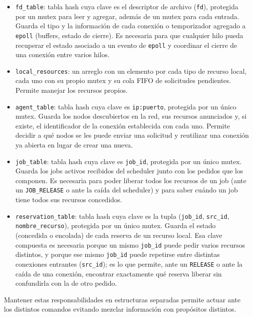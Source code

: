 \documentclass[a4paper,10pt]{article}
\begin{document}
\begin{itemize}
    \item \texttt{fd\_table}: tabla hash cuya clave es el descriptor de archivo (\texttt{fd}),
    protegida por un mutex para leer y agregar, además de un mutex para cada entrada. Guarda el tipo y la información de cada conexión o temporizador
    agregado a \texttt{epoll} (buffers, estado de cierre). Es necesaria para que cualquier hilo
    pueda recuperar el estado asociado a un evento de \texttt{epoll} y coordinar el cierre de una
    conexión entre varios hilos.
    \item \texttt{local\_resources}: un arreglo con un elemento por cada
    tipo de recurso local, cada uno con su propio mutex y su cola FIFO de solicitudes pendientes.
    Permite manejar los recursos propios.
    \item \texttt{agent\_table}: tabla hash cuya clave es \texttt{ip:puerto}, protegida por un único
    mutex. Guarda los nodos descubiertos en la red, sus recursos anunciados y, si existe, el
    identificador de la conexión establecida con cada uno. Permite decidir a qué nodos se les puede
    enviar una solicitud y reutilizar una conexión ya abierta en lugar de crear una nueva.
    \item \texttt{job\_table}: tabla hash cuya clave es \texttt{job\_id}, protegida por un único
    mutex. Guarda los jobs activos recibidos del scheduler junto con los pedidos que los componen.
    Es necesaria para poder liberar todos los recursos de un job (ante un \texttt{JOB\_RELEASE} o
    ante la caída del scheduler) y para saber cuándo un job tiene todos sus recursos concedidos.
    \item \texttt{reservation\_table}: tabla hash cuya clave es la tupla
    (\texttt{job\_id}, \texttt{src\_id}, \texttt{nombre\_recurso}), protegida por un único mutex.
    Guarda el estado (concedida o encolada) de cada reserva de un recurso local. Esa clave compuesta
    es necesaria porque un mismo \texttt{job\_id} puede pedir varios recursos distintos, y porque
    ese mismo \texttt{job\_id} puede repetirse entre distintas conexiones entrantes
    (\texttt{src\_id}); es lo que permite, ante un \texttt{RELEASE} o ante la caída de una
    conexión, encontrar exactamente qué reserva liberar sin confundirla con la de otro pedido.
\end{itemize}

\noindent Mantener estas responsabilidades en estructuras separadas permite actuar ante los distintos comandos evitando mezclar información con propósitos distintos.
\end{document}
